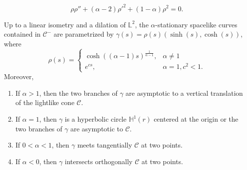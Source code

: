 \documentclass[10pt,a4paper]{amsart}
\def\h{\mathbb H}
\def\l{\mathbb L}
\begin{document}
\begin{equation}\label{k1}
\rho  \rho ''+(\alpha -2) \rho '^2+(1-\alpha ) \rho ^2=0.
\end{equation}

\begin{theorem} \label{pr41}
Up to a linear isometry and a dilation of $\l^2$, the   $\alpha$-stationary spacelike curves contained in $\mathcal{C}^-$ are parametrized by $\gamma(s)=\rho(s)(\sinh(s),\cosh(s))$, where 
\begin{equation}\label{so}
\rho(s)=\left\{\begin{array}{ll}
 \cosh((\alpha-1) s)^\frac{1}{\alpha-1},&\alpha\not=1\\
 e^{c s},&\alpha=1, c^2<1.
 \end{array}
 \right.
\end{equation}
 Moreover, 
\begin{enumerate}
\item If $\alpha> 1$, then  the two branches of  $\gamma$ are asymptotic to a vertical translation of the lightlike cone $\mathcal{C}$.  
\item If $\alpha=1$, then $\gamma$ is a hyperbolic circle $\h^1(r)$ centered at the origin or the two branches of $\gamma$ are asymptotic to $\mathcal{C}$. 
\item If $0<\alpha<1$, then $\gamma$ meets tangentially $\mathcal{C}$ at two points.  
\item If $\alpha<0$, then $\gamma$ intersects orthogonally $\mathcal{C}$ at two points.
\end{enumerate}
\end{theorem}
\end{document}

